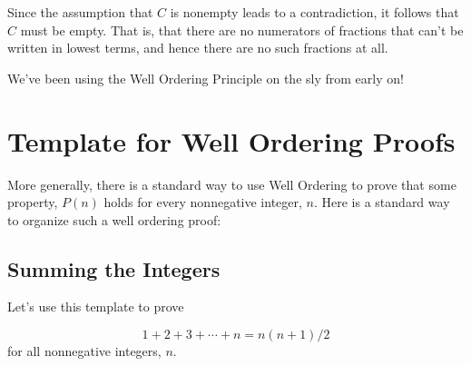 Since the assumption that $C$ is nonempty leads to a contradiction, it
follows that $C$ must be empty.  That is, that there are no numerators of
fractions that can't be written in lowest terms, and hence there are no
such fractions at all.

We've been using the Well Ordering Principle on the sly from early on!

\section{Template for Well Ordering Proofs}

More generally, there is a standard way to use Well Ordering to prove that
some property, $P(n)$ holds for every nonnegative integer, $n$.  Here is a
standard way to organize such a well ordering proof:

\subsection{Summing the Integers}
Let's use this template to prove %

\begin{theorem}  \label{sum_to_n_thm}
\begin{equation}\label{sum1n}
1 + 2 + 3 + \cdots + n = n(n+1)/2
\end{equation}
for all nonnegative integers, $n$.
\end{theorem}

